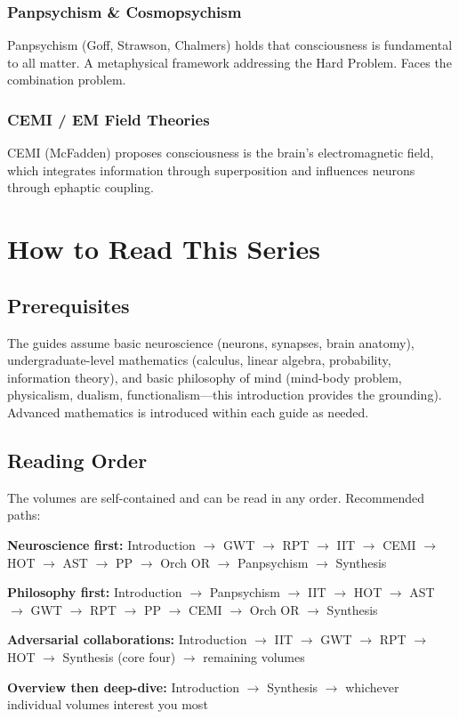 \documentclass[11pt,a4paper]{report}
\begin{document}
\subsection{Panpsychism \& Cosmopsychism}
Panpsychism (Goff, Strawson, Chalmers) holds that consciousness is fundamental to all matter. A metaphysical framework addressing the Hard Problem. Faces the combination problem.

\subsection{CEMI / EM Field Theories}
CEMI (McFadden) proposes consciousness is the brain's electromagnetic field, which integrates information through superposition and influences neurons through ephaptic coupling.


\chapter{How to Read This Series}

\section{Prerequisites}

The guides assume basic neuroscience (neurons, synapses, brain anatomy), undergraduate-level mathematics (calculus, linear algebra, probability, information theory), and basic philosophy of mind (mind-body problem, physicalism, dualism, functionalism---this introduction provides the grounding). Advanced mathematics is introduced within each guide as needed.

\section{Reading Order}

The volumes are self-contained and can be read in any order. Recommended paths:

\begin{guidebox}
\textbf{Neuroscience first:} Introduction $\to$ GWT $\to$ RPT $\to$ IIT $\to$ CEMI $\to$ HOT $\to$ AST $\to$ PP $\to$ Orch OR $\to$ Panpsychism $\to$ Synthesis

\textbf{Philosophy first:} Introduction $\to$ Panpsychism $\to$ IIT $\to$ HOT $\to$ AST $\to$ GWT $\to$ RPT $\to$ PP $\to$ CEMI $\to$ Orch OR $\to$ Synthesis

\textbf{Adversarial collaborations:} Introduction $\to$ IIT $\to$ GWT $\to$ RPT $\to$ HOT $\to$ Synthesis (core four) $\to$ remaining volumes

\textbf{Overview then deep-dive:} Introduction $\to$ Synthesis $\to$ whichever individual volumes interest you most
\end{guidebox}
\end{document}
